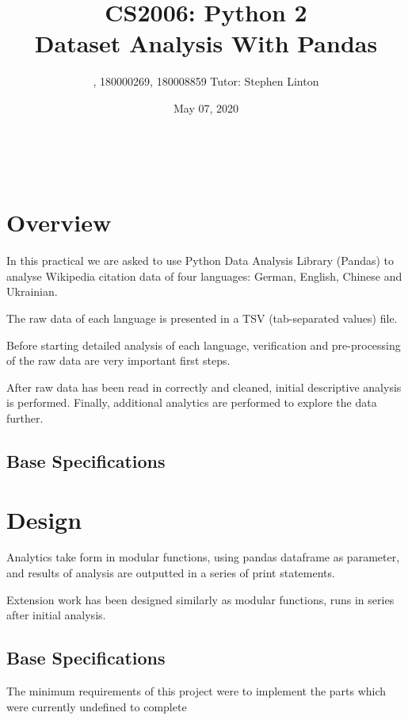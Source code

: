 \documentclass[12pt,a4paper,final]{article}
\begin{document}
\title{%
    CS2006: Python 2 \\
    \Large Dataset Analysis With Pandas} \\
\author{, 180000269, 180008859 Tutor: Stephen Linton}
\date{May 07, 2020}
\maketitle

\section*{Overview}
In this practical we are asked to use Python Data Analysis Library (Pandas) to analyse Wikipedia citation data of four languages: German, English, Chinese and Ukrainian.

The raw data of each language is presented in a TSV (tab-separated values) file.

Before starting detailed analysis of each language, verification and pre-processing of the raw data are very important first steps.

After raw data has been read in correctly and cleaned, initial descriptive analysis is performed. Finally, additional analytics are performed to explore the data further.

\subsection*{Base Specifications}

\begin{itemize}[noitemsep]

\end{itemize}

\section*{Design}
Analytics take form in modular functions, using pandas dataframe as parameter, and results of analysis are outputted in a series of print statements.

Extension work has been designed similarly as modular functions, runs in series after initial analysis.

\subsection*{Base Specifications}

The minimum requirements of this project were to implement the parts which were currently undefined
to complete
\end{document}
